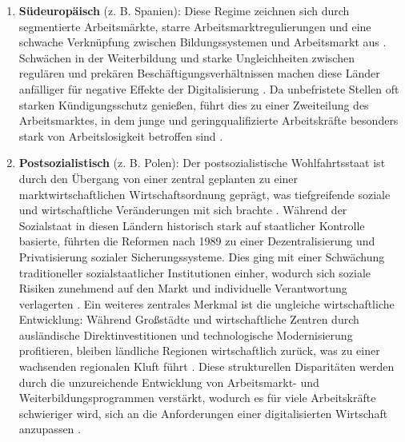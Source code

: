 \begin{enumerate}

    \item \textbf{Südeuropäisch} (z. B. Spanien): Diese Regime zeichnen sich durch segmentierte 
    Arbeitsmärkte, starre Arbeitsmarktregulierungen und eine schwache Verknüpfung zwischen 
    Bildungssystemen und Arbeitsmarkt aus \parencite[S. 19]{ferrera1996thesouthern}. Schwächen in 
    der Weiterbildung und starke Ungleichheiten zwischen regulären und prekären 
    Beschäftigungsverhältnissen machen diese Länder anfälliger für negative Effekte der 
    Digitalisierung \parencite[S. 19–20]{ferrera1996thesouthern}. Da unbefristete Stellen oft 
    starken Kündigungsschutz genießen, führt dies zu einer Zweiteilung des Arbeitsmarktes, in dem 
    junge und geringqualifizierte Arbeitskräfte besonders stark von Arbeitslosigkeit betroffen 
    sind \parencite[S. 19–21]{ferrera1996thesouthern}.
    
    \item \textbf{Postsozialistisch} (z. B. Polen): Der postsozialistische Wohlfahrtsstaat ist 
    durch den Übergang von einer zentral geplanten zu einer marktwirtschaftlichen 
    Wirtschaftsordnung geprägt, was tiefgreifende soziale und wirtschaftliche Veränderungen mit 
    sich brachte \parencite[S. 104]{cerami2006socialpolicy}. Während der Sozialstaat in diesen 
    Ländern historisch stark auf staatlicher Kontrolle basierte, führten die Reformen nach 1989 
    zu einer Dezentralisierung und Privatisierung sozialer Sicherungssysteme. Dies ging mit einer 
    Schwächung traditioneller sozialstaatlicher Institutionen einher, wodurch sich soziale 
    Risiken zunehmend auf den Markt und individuelle Verantwortung verlagerten 
    \parencite[vgl.][S. 104–105]{cerami2006socialpolicy}. Ein weiteres zentrales Merkmal ist die 
    ungleiche wirtschaftliche Entwicklung: Während Großstädte und wirtschaftliche Zentren durch 
    ausländische Direktinvestitionen und technologische Modernisierung profitieren, bleiben 
    ländliche Regionen wirtschaftlich zurück, was zu einer wachsenden regionalen Kluft führt 
    \parencite[vgl.][S. 169]{cerami2006socialpolicy}. Diese strukturellen Disparitäten werden 
    durch die unzureichende Entwicklung von Arbeitsmarkt- und Weiterbildungsprogrammen verstärkt, 
    wodurch es für viele Arbeitskräfte schwieriger wird, sich an die Anforderungen einer 
    digitalisierten Wirtschaft anzupassen \parencite[vgl.][S. 105]{cerami2006socialpolicy}.
    
\end{enumerate}

